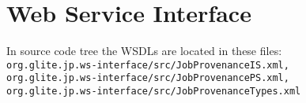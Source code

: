 \section{Web Service Interface}

In source code tree the WSDLs are located in these files:\\
\texttt{org.glite.jp.ws-interface/src/JobProvenanceIS.xml,\\
org.glite.jp.ws-interface/src/JobProvenancePS.xml,\\
org.glite.jp.ws-interface/src/JobProvenanceTypes.xml
}


{
\parindent0pt
\def\chapter#1{}
\def\section#1{\subsection{#1}}
\def\subsection#1{\par\medskip\textbf{#1}\par}

\let\odesc=\description
\let\oedesc=\enddescription
\renewenvironment{description}{\odesc\itemindent=1em
\listparindent=2em
}{\oedesc}

\let\null=\relax



}

